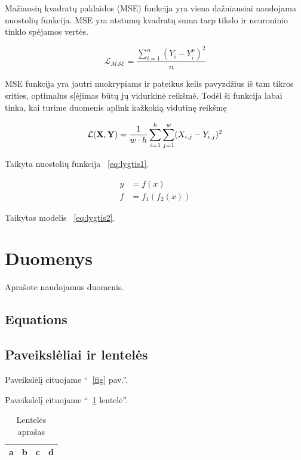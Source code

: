 \documentclass[conference]{IEEEtran}
\begin{document}
Mažiausių kvadratų paklaidos (MSE) funkcija yra viena dažniausiai naudojama nuostolių funkcija. MSE yra atstumų kvadratų suma tarp tikslo ir neuroninio tinklo spėjamos vertės. 

\begin{equation}
\mathcal{L_{MSE}} = \frac{\sum_{i=1}^n(Y_{i}-Y_{i}^p)^2}{n}
\label{eq:MSE function}
\end{equation}

MSE funkcija yra jautri nuokrypiams ir pateikus kelis pavyzdžius iš tam tikros srities, optimalus s[ėjimas būtų jų vidurkinė reikšmė. Todėl ši funkcija labai tinka, kai turime duomenis aplink kažkokią vidutinę reikšmę

\begin{equation}
\mathcal{L}({\bf X}, {\bf Y}) = \frac{1}{w \cdot h} \sum_{i=1}^h \sum_{j=1}^w (X_{i, j} - Y_{i, j})^2
\label{eq:lygtis1}
\end{equation}

Taikyta nuostolių funkcija ~\eqref{eq:lygtis1}.

\begin{align}
y & = f(x) \nonumber \\
f & = f_1(f_2(x))
\label{eq:lygtis2}
\end{align}

Taikytas modelis ~\eqref{eq:lygtis2}.


\section{Duomenys}
Aprašote naudojamus duomenis.

\subsection{Equations}



\subsection{Paveikslėliai ir lentelės}

Paveikslėlį cituojame ``~\ref{fig} pav.''.

Paveikslėlį cituojame ``~\ref{tab1} lentelė''.

\begin{table}[htbp]
\caption{Lentelės aprašas}
\begin{center}
\begin{tabular}{|c|c|c|c|}
\hline
a & b & c &  d \\
\hline
\end{tabular}
\label{tab1}
\end{center}
\end{table}
\end{document}

